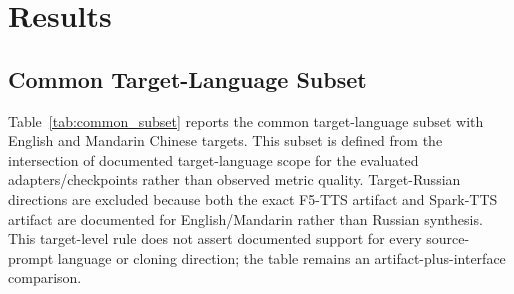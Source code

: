 \documentclass[11pt]{article}
\begin{document}
\section{Results}

\subsection{Common Target-Language Subset}

Table~\ref{tab:common_subset} reports the common target-language subset with English and Mandarin Chinese targets. This subset is defined from the intersection of documented target-language scope for the evaluated adapters/checkpoints rather than observed metric quality. Target-Russian directions are excluded because both the exact F5-TTS artifact and Spark-TTS artifact are documented for English/Mandarin rather than Russian synthesis. This target-level rule does not assert documented support for every source-prompt language or cloning direction; the table remains an artifact-plus-interface comparison.

\begin{table}[t]
\centering
\caption{Common target-language subset. Only English and Mandarin Chinese target conditions are included. CIs use the crossed reference/text bootstrap; one Spark-TTS synthetic placeholder is excluded.}
\label{tab:common_subset}
\end{table}
\end{document}
